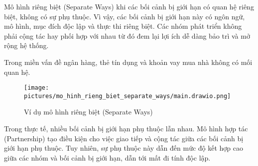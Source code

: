 








Mô hình riêng biệt (Separate Ways) khi các bối cảnh bị giới hạn có quan hệ riêng biệt, không có sự phụ thuộc. Vì vậy, các bối cảnh bị giới hạn này có ngôn ngữ, mô hình, mục đích độc lập và thực thi riêng biệt. Các nhóm phát triển không phải cộng tác hay phối hợp với nhau từ đó đem lại lợi ích dễ dàng bảo trì và mở rộng hệ thống.

\begin{example} Trong miền vấn đề ngân hàng, thẻ tín dụng và khoản vay mua nhà không có mối quan hệ.

\begin{figure}[H]

\centering

\texttt{[image: pictures/mo\_hinh\_rieng\_biet\_separate\_ways/main.drawio.png]}

\caption{Ví dụ mô hình riêng biệt (Separate Ways)}

\end{figure}

\end{example}


Trong thực tế, nhiều bối cảnh bị giới hạn phụ thuộc lẫn nhau. Mô hình hợp tác (Partnership) tạo điều kiện cho việc giao tiếp và cộng tác giữa các bối cảnh bị giới hạn phụ thuộc. Tuy nhiên, sự phụ thuộc này dẫn đến mức độ kết hợp cao giữa các nhóm và bối cảnh bị giới hạn, dẫn tới mất đi tính độc lập.

